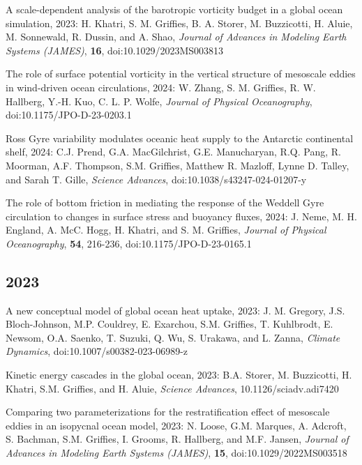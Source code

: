 \begin{etaremune}
\item A scale-dependent analysis of the barotropic vorticity budget in a global ocean simulation, 2023: H. Khatri, S. M. Grif\/f\/ies, B. A. Storer, M. Buzzicotti, H. Aluie, M. Sonnewald, R. Dussin, and A. Shao, {\it Journal of Advances in Modeling Earth Systems (JAMES)}, {\bf 16}, doi:10.1029/2023MS003813

\item The role of surface potential vorticity in the vertical structure of mesoscale eddies in wind-driven ocean circulations, 2024: W. Zhang, S. M. Grif\/f\/ies, R. W. Hallberg, Y.-H. Kuo, C. L. P. Wolfe, {\it Journal of Physical Oceanography}, doi:10.1175/JPO-D-23-0203.1

\item Ross Gyre variability modulates oceanic heat supply to the Antarctic continental shelf, 2024: C.J. Prend, G.A. MacGilchrist, G.E. Manucharyan, R.Q. Pang, R. Moorman, A.F. Thompson, S.M. Grif\/f\/ies, Matthew R. Mazloff, Lynne D. Talley, and Sarah T. Gille, {\it Science Advances}, doi:10.1038/s43247-024-01207-y

\item  The role of bottom friction in mediating the response of the Weddell Gyre circulation to changes in surface stress and buoyancy fluxes, 2024: J. Neme, M. H. England, A. McC. Hogg, H. Khatri, and S. M. Grif\/f\/ies, {\it Journal of Physical Oceanography}, {\bf 54}, 216-236, doi:10.1175/JPO-D-23-0165.1 


\subsection*{\sc \color{Maroon} 2023}


\item A new conceptual model of global ocean heat uptake, 2023:  J. M. Gregory, J.S. Bloch-Johnson, M.P. Couldrey, E. Exarchou, S.M. Grif\/f\/ies, T. Kuhlbrodt, E. Newsom, O.A. Saenko, T. Suzuki, Q. Wu, S. Urakawa, and L. Zanna, {\it Climate Dynamics}, doi:10.1007/s00382-023-06989-z
 
\item Kinetic energy cascades in the global ocean, 2023: B.A. Storer, M. Buzzicotti, H. Khatri, S.M. Grif\/f\/ies, and H. Aluie,  {\it Science Advances}, 10.1126/sciadv.adi7420

\item Comparing two parameterizations for the restratification effect of mesoscale eddies in an isopycnal ocean model, 2023: N. Loose, G.M. Marques, A. Adcroft, S. Bachman, S.M. Grif\/f\/ies, I. Grooms, R. Hallberg, and M.F. Jansen, {\it Journal of Advances in Modeling Earth Systems (JAMES)}, {\bf 15}, doi:10.1029/2022MS003518


\end{etaremune}
